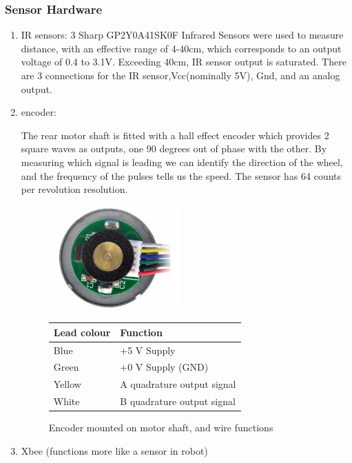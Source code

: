 \documentclass[11pt,a4paper]{article}
\begin{document}
    \subsubsection{Sensor Hardware}
      \begin{enumerate}
        \item IR sensors:{ 3 Sharp GP2Y0A41SK0F Infrared Sensors were used to measure distance, with an effective range of 4-40cm, which corresponds to an output voltage of 0.4 to 3.1V. Exceeding 40cm, IR sensor output is saturated. There are 3 connections for the IR sensor,Vcc(nominally 5V), Gnd, and an analog output.}
        \item encoder:{ The rear motor shaft is fitted with a hall effect encoder which provides 2 square waves as outputs, one 90 degrees out of phase with the other. By measuring which signal is leading we can identify the direction of the wheel, and the frequency of the pulses tells us the speed. The sensor has 64 counts per revolution resolution.
        \begin{figure}
          \centering
          \begin{minipage}{0.45\textwidth}
              \centering
              \includegraphics[width = 5cm]{encoder.png}
          \end{minipage}\hfill
          \begin{minipage}{0.45\textwidth}
              \centering
              \begin{tabular}[b]{|l|l|}
                \hline \textbf{Lead colour} & \textbf{Function}\\
                \hline Blue   & +5 V Supply\\
                \hline Green  & +0 V Supply (GND)\\
                \hline Yellow & A quadrature output signal\\
                \hline White  & B quadrature output signal\\
                \hline
              \end{tabular}
          \end{minipage}
          \caption{Encoder mounted on motor shaft, and wire functions}
        \end{figure}
        }
        \item Xbee (functions more like a sensor in robot)
      \end{enumerate}
\end{document}

